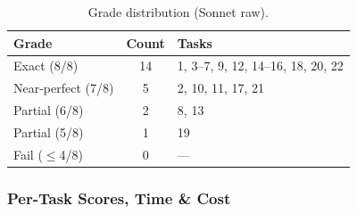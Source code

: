 \begin{table}[h]
\centering
\caption{Grade distribution (Sonnet raw).}\label{tab:grade-raw-sonnet}
\begin{tabular}{lcl}
\toprule
\textbf{Grade} & \textbf{Count} & \textbf{Tasks} \\
\midrule
Exact (8/8)        & 14 & 1, 3--7, 9, 12, 14--16, 18, 20, 22 \\
Near-perfect (7/8) &  5 & 2, 10, 11, 17, 21 \\
Partial (6/8)      &  2 & 8, 13 \\
Partial (5/8)      &  1 & 19 \\
Fail ($\le$4/8)    &  0 & --- \\
\bottomrule
\end{tabular}
\end{table}

\subsubsection{Per-Task Scores, Time \& Cost}

